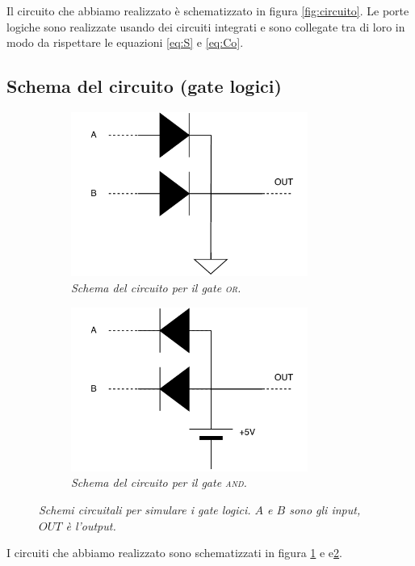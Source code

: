 Il circuito che abbiamo realizzato è schematizzato in figura \ref{fig:circuito}.
Le porte logiche sono realizzate usando dei circuiti integrati e sono collegate tra di loro
in modo da rispettare le equazioni \eqref{eq:S} e \ref{eq:Co}.

\subsection{Schema del circuito (gate logici)}\label{subsec:schema-circuito-gate}
\begin{figure}[h]
  \begin{subfigure}[t]{.47\textwidth}
    \includegraphics[width=7.75cm]{../assets/or.drawio.pdf}
    \caption{
      \emph{
        Schema del circuito per il gate \textsc{or}.
      }
    }
    \label{fig:or-gate}
  \end{subfigure}
  \hspace{5mm}
  \begin{subfigure}[t]{.47\textwidth}
    \includegraphics[width=7.75cm]{../assets/and.drawio.pdf}
    \caption{
      \emph{
        Schema del circuito per il gate \textsc{and}.
      }
    }
    \label{fig:and-gate}
  \end{subfigure}
  \caption{\emph{Schemi circuitali per simulare i gate logici. $A$ e $B$ sono gli input, $OUT$ è l'output.}}
  \label{fig:circuiti-gate}
\end{figure}

I circuiti che abbiamo realizzato sono schematizzati in figura \ref{fig:or-gate} e e\ref{fig:and-gate}.

